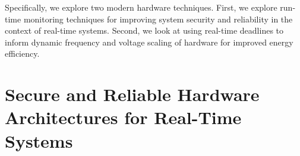 Specifically, we explore two modern hardware techniques. First, we explore
run-time monitoring techniques for improving system security and reliability in
the context of real-time systems. Second, we look at using real-time deadlines
to inform dynamic frequency and voltage scaling of hardware for improved energy efficiency.

% 

\section{Secure and Reliable Hardware Architectures for Real-Time Systems}
\label{sec:intro.security}

